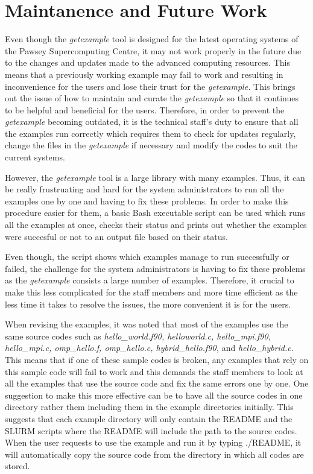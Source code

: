\section{Maintanence and Future Work}

Even though the \emph{getexample} tool is designed for the latest operating systems of the Pawsey Supercomputing Centre, it may not work properly in the future
due to the changes and updates made to the advanced computing resources. This means that a previously working example may fail to work and resulting in 
inconvenience for the users and lose their trust for the \emph{getexample.} This brings out the issue of how to maintain and curate the \emph{getexample} so that it 
continues to be helpful and beneficial for the users. Therefore, in order to prevent the \emph{getexample} becoming outdated, it is the technical staff's duty 
to ensure that all the examples run correctly which requires them to check for updates regularly, change the files in the \emph{getexample} if necessary and 
modify the codes to suit the current systems.

However, the \emph{getexample} tool is a large library with many examples. Thus, it can be really frustruating and hard for the system administrators to run 
all the examples one by one and having to fix these problems. In order to make this procedure easier for them, a basic Bash executable script can be 
used which runs all the examples at once, checks their status and prints out whether the examples were succesful or not to an output file based on their
status.

Even though, the script shows which examples manage to run successfully or failed, the challenge for the system administrators is having to fix 
these problems as the \emph{getexample} consists a large number of examples. Therefore, it crucial to make this less complicated for the staff members and more
time efficient as the less time it takes to resolve the issues, the more convenient it is for the users. 

When revising the examples, it was noted that most of the examples use the same source codes such as \emph{hello\_world.f90, helloworld.c, 
hello\_mpi.f90, hello\_mpi.c, omp\_hello.f, omp\_hello.c, hybrid\_hello.f90,} and \emph{hello\_hybrid.c}. This means that if one of these sample codes is
broken, any examples that rely on this sample code will fail to work and this demands the staff members to look at all the examples that use the source
code and fix the same errors one by one. One suggestion to make this more effective can be to have all the source codes in one directory rather them
including them in the example directories initially. This suggests that each example directory will only contain the README and the SLURM scripts where
the README will include the path to the source codes. When the user requests to use the example and run it by typing ./README, it will automatically
copy the source code from the directory in which all codes are stored.

